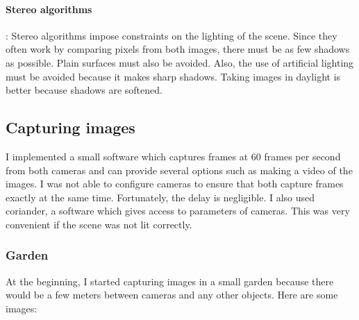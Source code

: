 \documentclass[11pt]{report}
\begin{document}
\paragraph{Stereo algorithms}: Stereo algorithms impose constraints on the lighting of the scene. Since they often work by comparing pixels from both images, there must be as few shadows as possible. Plain surfaces must also be avoided. Also, the use of artificial lighting must be avoided because it makes sharp shadows. Taking images in daylight is better because shadows are softened.

\subsection{Capturing images}

I implemented a small software which captures frames at 60 frames per second from both cameras and can provide several options such as making a video of the images. I was not able to configure cameras to ensure that both capture frames exactly at the same time. Fortunately, the delay is negligible. I also used coriander, a software which gives access to parameters of cameras. This was very convenient if the scene was not lit correctly.


\subsubsection{Garden}
At the beginning, I started capturing images in a small garden because there would be a few meters between cameras and any other objects. Here are some images:
\end{document}
